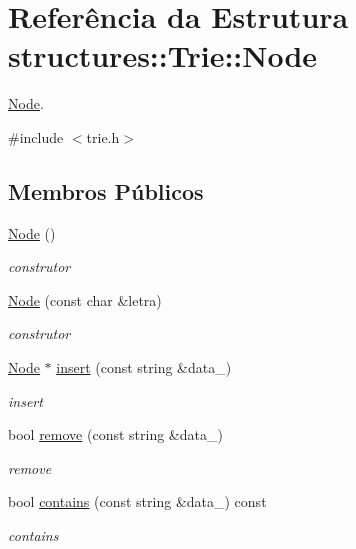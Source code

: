 \hypertarget{structstructures_1_1Trie_1_1Node}{}\section{Referência da Estrutura structures\+::Trie\+::Node}
\label{structstructures_1_1Trie_1_1Node}


\mbox{\hyperlink{structstructures_1_1Trie_1_1Node}{Node}}.  




{\ttfamily \#include $<$trie.\+h$>$}

\subsection*{Membros Públicos}
\begin{DoxyCompactItemize}
\item 
\mbox{\hyperlink{structstructures_1_1Trie_1_1Node_aa9593c9a81027a7f2cea784bcb5dcf8b}{Node}} ()
\begin{DoxyCompactList}\small\item\em construtor \end{DoxyCompactList}\item 
\mbox{\hyperlink{structstructures_1_1Trie_1_1Node_a041b9e64c7beca6aa364235fde984d3f}{Node}} (const char \&letra)
\begin{DoxyCompactList}\small\item\em construtor \end{DoxyCompactList}\item 
\mbox{\hyperlink{structstructures_1_1Trie_1_1Node}{Node}} $\ast$ \mbox{\hyperlink{structstructures_1_1Trie_1_1Node_a825f36b61a5878b622b77a4956756505}{insert}} (const string \&data\+\_\+)
\begin{DoxyCompactList}\small\item\em insert \end{DoxyCompactList}\item 
bool \mbox{\hyperlink{structstructures_1_1Trie_1_1Node_a977ee185cc90869cf5f9d8d945aadf46}{remove}} (const string \&data\+\_\+)
\begin{DoxyCompactList}\small\item\em remove \end{DoxyCompactList}\item 
bool \mbox{\hyperlink{structstructures_1_1Trie_1_1Node_ab038c557d82c3a97a94748f3e9552c51}{contains}} (const string \&data\+\_\+) const
\begin{DoxyCompactList}\small\item\em contains \end{DoxyCompactList}\item 

\end{DoxyCompactItemize}
